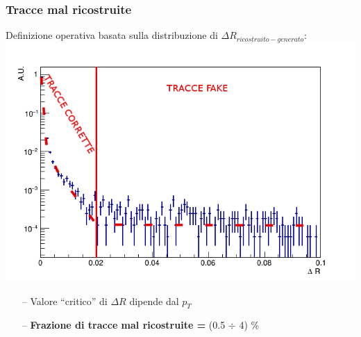 \documentclass{beamer}
\begin{document}
\begin{frame}
\frametitle{Tracce mal ricostruite}
Definizione operativa basata sulla distribuzione di $\Delta R_{ricostruito - generato}$:
\centering
\includegraphics[width=.7\textwidth]{Tracking/pionMatchingDR2}

\begin{itemize}
\item [\color{black}--] Valore ``critico'' di $\Delta R$ dipende dal $p_{T}$
\item[\color{black}--] \textbf{Frazione di tracce mal ricostruite = } (0.5 $\div$ 4) \%
\end{itemize}
\end{frame}

\end{document}
